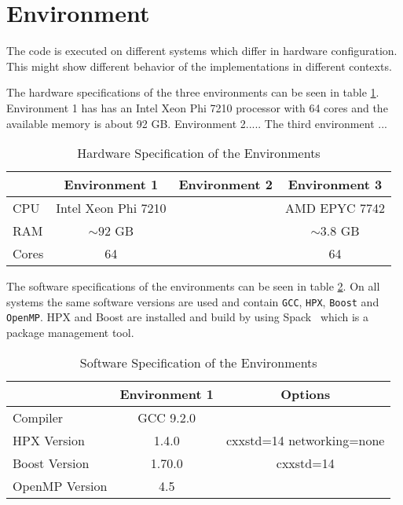 \section{Environment}
  The code is executed on different systems which differ in hardware configuration.
  This might show different behavior of the implementations in different contexts.

The hardware specifications of the three environments can be seen in table \ref{tab:hardEnv}.
Environment 1 has has an Intel Xeon Phi 7210 processor with 64 cores and the available memory is about 92 GB.
Environment 2.....
The third environment ...
\begin{table}
\centering
\caption{Hardware Specification of the Environments}
\begin{tabular}[h]{l c c c}
 & Environment 1 & Environment 2 & Environment 3  \\\hline
CPU & Intel Xeon Phi 7210 &  & AMD EPYC 7742 \\
RAM & $\sim 92$ GB &  & $\sim 3.8$ GB \\
Cores & 64 &  & 64 \\\hline
\end{tabular}
\label{tab:hardEnv}
\end{table}

The software specifications of the environments can be seen in table \ref{tab:softEnv}.
On all systems the same software versions are used and contain \texttt{GCC}, \texttt{HPX}, \texttt{Boost} and \texttt{OpenMP}.
HPX and Boost are installed and build by using Spack~\cite{Spack.2020} which is a package management tool.
\begin{table}
\centering
\caption{Software Specification of the Environments}
\begin{tabular}[h]{l c c}
\centering
 & Environment 1 & Options\\\hline
Compiler & GCC 9.2.0 & \\
HPX Version & 1.4.0 & cxxstd=14 networking=none  \\
Boost Version & 1.70.0 & cxxstd=14 \\
OpenMP Version & 4.5 & \\\hline
\end{tabular}
\label{tab:softEnv}
\end{table}